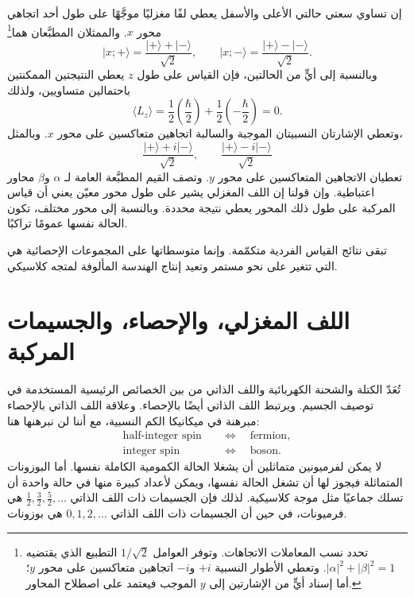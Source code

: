 إن تساوي سعتي حالتي الأعلى والأسفل يعطي لفًا مغزليًا موجَّهًا على طول أحد اتجاهي محور \(x\). والممثلان المطبَّعان هما\footnote{تحدد نسب المعاملات الاتجاهات. وتوفر العوامل \(1/\sqrt2\) التطبيع الذي يقتضيه \( |\alpha|^2+|\beta|^2=1\). وتعطي الأطوار النسبية \(+i\) و\(-i\) اتجاهين متعاكسين على محور \(y\)؛ أما إسناد أيٍّ من الإشارتين إلى \(y\) الموجب فيعتمد على اصطلاح المحاور.}
\begin{equation}
\lvert x;+\rangle
=
\frac{\lvert+\rangle+\lvert-\rangle}{\sqrt2},
\qquad
\lvert x;-\rangle
=
\frac{\lvert+\rangle-\lvert-\rangle}{\sqrt2}.
\end{equation}
وبالنسبة إلى أيٍّ من الحالتين، فإن القياس على طول \(z\) يعطي النتيجتين الممكنتين باحتمالين متساويين، ولذلك
\begin{equation}
\langle L_z\rangle
=
\frac12\left(\frac{\hbar}{2}\right)
+
\frac12\left(-\frac{\hbar}{2}\right)
=0.
\end{equation}
وتعطي الإشارتان النسبيتان الموجبة والسالبة اتجاهين متعاكسين على محور \(x\). وبالمثل،
\begin{equation}
\frac{\lvert+\rangle+i\lvert-\rangle}{\sqrt2},
\qquad
\frac{\lvert+\rangle-i\lvert-\rangle}{\sqrt2}
\end{equation}
تعطيان الاتجاهين المتعاكسين على محور \(y\). وتصف القيم المطبَّعة العامة لـ \(\alpha\) و\(\beta\) محاور اعتباطية. وإن قولنا إن اللف المغزلي يشير على طول محور معيّن يعني أن قياس المركبة على طول ذلك المحور يعطي نتيجة محددة. وبالنسبة إلى محور مختلف، تكون الحالة نفسها عمومًا تراكبًا.

تبقى نتائج القياس الفردية متكمّمة. وإنما متوسطاتها على المجموعات الإحصائية هي التي تتغير على نحو مستمر وتعيد إنتاج الهندسة المألوفة لمتجه كلاسيكي.

\section{اللف المغزلي، والإحصاء، والجسيمات المركبة}

تُعَدّ الكتلة والشحنة الكهربائية واللف الذاتي من بين الخصائص الرئيسية المستخدمة في توصيف الجسيم. ويرتبط اللف الذاتي أيضًا بالإحصاء. وعلاقة اللف الذاتي بالإحصاء مبرهنة في ميكانيكا الكم النسبية، مع أننا لن نبرهنها هنا:
\begin{equation}
\begin{aligned}
\text{half-integer spin} &\quad\Longleftrightarrow\quad \text{fermion},\\
\text{integer spin} &\quad\Longleftrightarrow\quad \text{boson}.
\end{aligned}
\end{equation}
لا يمكن لفرميونين متماثلين أن يشغلا الحالة الكمومية الكاملة نفسها. أما البوزونات المتماثلة فيجوز لها أن تشغل الحالة نفسها، ويمكن لأعداد كبيرة منها في حالة واحدة أن تسلك جماعيًا مثل موجة كلاسيكية. لذلك فإن الجسيمات ذات اللف الذاتي \(\tfrac12,\tfrac32,\tfrac52,\ldots\) هي فرميونات، في حين أن الجسيمات ذات اللف الذاتي \(0,1,2,\ldots\) هي بوزونات.

